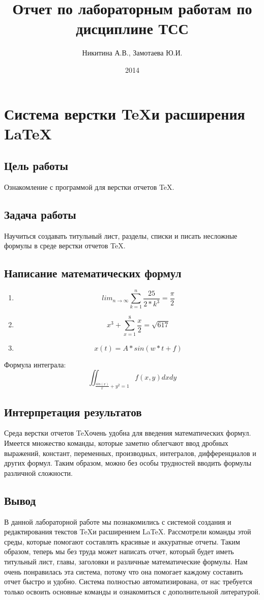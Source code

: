 \documentclass[10pt,a4paper]{article}
\author{Никитина А.В., Замотаева Ю.И.}
\title{Отчет по лабораторным работам по дисциплине ТСС}
\date{2014}
\begin{document}
\maketitle
\pagebreak
\tableofcontents
\pagebreak
\section{Система верстки \TeX и расширения \LaTeX}
\subsection{Цель работы}
Ознакомление с программой для верстки отчетов \TeX.
\subsection{Задача работы}
Научиться создавать титульный лист, разделы, списки и писать несложные формулы в среде верстки отчетов \TeX.
\subsection{Написание математических формул}
\begin{enumerate}
\item
\begin{displaymath}
lim_{n \to \infty}
\sum_{k=1}^n \frac{25}{2*k^3}
= \frac{\pi}{2}
\end{displaymath}
\item 
\begin{displaymath}
x^{3}+\sum_{x=1}^8 \frac{x}{2}
= \sqrt{617}
\end{displaymath}
\item 
\begin{displaymath}
x(t) = A * sin(w*t+f)
\end{displaymath}
\end{enumerate}
Формула интеграла:
\begin{displaymath}
\iint_{\frac{sin(x)}{x}+y^{2} = 1} f(x, y) dx dy 
\end{displaymath}
\subsection{Интерпретация результатов}
Среда верстки отчетов \TeX очень удобна для введения математических формул. Имеется множество команды, которые заметно облегчают ввод дробных выражений, констант, переменных, производных, интегралов, дифференциалов и других формул. Таким образом, можно без особы трудностей вводить формулы различной сложности.
\subsection{Вывод}
В данной лабораторной работе мы познакомились  с системой создания и редактирования текстов \TeX и расширением \LaTeX. Рассмотрели команды этой среды, которые помогают составлять красивые и аккуратные отчеты.
Таким образом, теперь мы без труда может написать отчет, который будет иметь титульный лист, главы, заголовки и различные математические формулы. Нам очень понравилась эта система, потому что она помогает каждому составить отчет быстро и удобно. Система полностью автоматизирована, от нас требуется только освоить основные команды и ознакомиться с дополнительной литературой.
\end{document}
